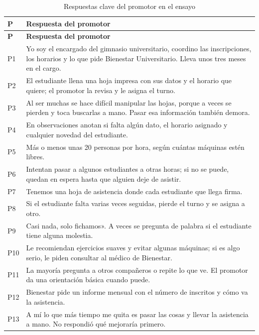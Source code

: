 \documentclass[12pt,a4paper]{article}
\begin{document}
\begingroup\small
\begin{longtable}{>{\raggedright\arraybackslash}p{0.9cm} >{\raggedright\arraybackslash}p{13.4cm}}
\caption{Respuestas clave del promotor en el ensayo}\\
\rowcolor{verdeP}\textbf{P} & \textbf{Respuesta del promotor} \\
\endfirsthead
\rowcolor{verdeP}\textbf{P} & \textbf{Respuesta del promotor} \\
\endhead
\rowcolor{verdeS}P1 & Yo soy el encargado del gimnasio universitario, coordino las inscripciones, los horarios y lo que pide Bienestar Universitario. Lleva unos tres meses en el cargo. \\
\rowcolor{white}P2 & El estudiante llena una hoja impresa con sus datos y el horario que quiere; el promotor la revisa y le asigna el turno. \\
\rowcolor{verdeS}P3 & Al ser muchas se hace difícil manipular las hojas, porque a veces se pierden y toca buscarlas a mano. Pasar esa información también demora. \\
\rowcolor{white}P4 & En observaciones anotan si falta algún dato, el horario asignado y cualquier novedad del estudiante. \\
\rowcolor{verdeS}P5 &  Más o menos unas 20 personas por hora, según cuántas máquinas estén libres. \\
\rowcolor{white}P6 & Intentan pasar a algunos estudiantes a otras horas; si no se puede, quedan en espera hasta que alguien deje de asistir. \\
\rowcolor{verdeS}P7 & Tenemos una hoja de asistencia donde cada estudiante que llega firma. \\
\rowcolor{white}P8 & Si el estudiante falta varias veces seguidas, pierde el turno y se asigna a otro. \\
\rowcolor{verdeS}P9 & Casi nada, solo fichamos». A veces se pregunta de palabra si el estudiante tiene alguna molestia. \\
\rowcolor{white}P10 & Le recomiendan ejercicios suaves y evitar algunas máquinas; si es algo serio, le piden consultar al médico de Bienestar. \\
\rowcolor{verdeS}P11 & La mayoría pregunta a otros compañeros o repite lo que ve. El promotor da una orientación básica cuando puede. \\
\rowcolor{white}P12 & Bienestar pide un informe mensual con el número de inscritos y cómo va la asistencia. \\
\rowcolor{verdeS}P13 & A mí lo que más tiempo me quita es pasar las cosas y llevar la asistencia a mano. No respondió qué mejoraría primero. \\
\end{longtable}
\endgroup
\end{document}

